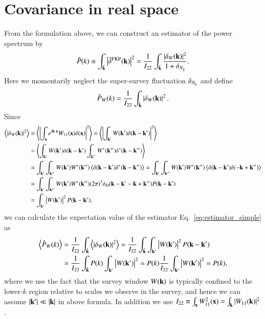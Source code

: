 \documentclass[onecolumn,showpacs,amsmath,amssymb,prd,floatfix,preprintnumbers]{revtex4}
\newcommand{\bx}{{\bf x}}
\newcommand{\bk}{{\bf k}}
\def\avrg#1{\left\langle #1 \right\rangle}
\begin{document}
\section{Covariance in real space}

From the formulation above, we can construct an estimator of the power spectrum by
\begin{align}
\label{eq:FKPestimator}
  \hat{P}(k) \equiv \int_{\hat{\bk}} \left| \hat{\delta}^{\rm FKP}(\bk) \right|^2 = \frac{1}{I_{22}} \int_{\hat{\bk}} \frac{\left| \delta_W(\bk) \right|^2}{1+\delta_{N_{\rm g}}}.
\end{align}
Here we momentarily neglect the super-survey fluctuation $\delta_{N_{\rm g}}$ and define
\begin{align}
\label{eq:estimator_simple}
  \hat{P}_W(k) = \frac{1}{I_{22}} \int_{\hat{\bk}} \left|\delta_W(\bk) \right|^2.
\end{align}
Since 
\begin{align}
  \avrg{\left|\delta_W(\bk) \right|^2} &= \avrg{\left| \int_{\bx} e^{i\bk \cdot \bx} W_{11}(\bx) \delta(\bx) \right|^2}
  = \avrg{ \left| \int_{\bk'} W(\bk') \delta(\bk-\bk') \right|^2} \nonumber \\
  &= \avrg{ \int_{\bk'} W(\bk') \delta(\bk-\bk') \int_{\bk''} W^\ast(\bk'') \delta^\ast(\bk-\bk'') } \nonumber \\
  &= \int_{\bk'} \int_{\bk''} W(\bk') W^\ast(\bk'') \avrg{ \delta(\bk-\bk') \delta^\ast(\bk-\bk'') }
  = \int_{\bk'} \int_{\bk''} W(\bk') W^\ast(\bk'') \avrg{ \delta(\bk-\bk') \delta(-\bk+\bk'') } \nonumber \\
  &= \int_{\bk'} \int_{\bk''} W(\bk') W^\ast(\bk'') (2\pi)^3 \delta_{\rm D}(\bk-\bk'-\bk+\bk'') P(\bk-\bk') \nonumber \\
  &= \int_{\bk'} \left|W(\bk')\right|^2 P(\bk-\bk'),
\end{align}
we can calculate the expectation value of the estimator Eq.~\ref{eq:estimator_simple} as
\begin{align}
  \avrg{\hat{P}_W(k)} &= \frac{1}{I_{22}} \int_{\hat{\bk}} \avrg{\left|\delta_W(\bk) \right|^2}
  = \frac{1}{I_{22}} \int_{\hat{\bk}} \int_{\bk'} \left|W(\bk')\right|^2 P(\bk-\bk') \nonumber \\
  &\simeq \frac{1}{I_{22}} \int_{\hat{\bk}} P(k) \int_{\bk'} \left|W(\bk')\right|^2
  = P(k) \frac{1}{I_{22}} \int_{\bk'} \left|W(\bk')\right|^2 = P(k),
\end{align}
where we use the fact that the survey window $W(\bk)$ is typically confined to the lower-$k$ region relative to scales we observe in the survey, and hence we can assume $|\bk'| \ll |\bk|$ in above formula. In addition we use $I_{22} \equiv \int_\bx W_{11}^2(\bx) = \int_\bk |W_{11}(\bk)|^2$.
\end{document}

